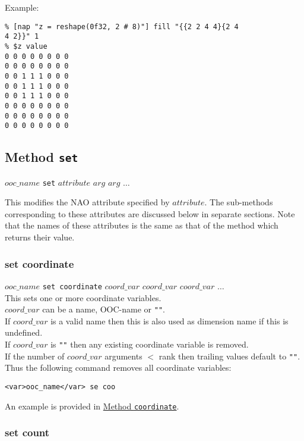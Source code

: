 Example:
  \begin{verbatim}
% [nap "z = reshape(0f32, 2 # 8)"] fill "{{2 2 4 4}{2 4
4 2}}" 1
% $z value
0 0 0 0 0 0 0 0
0 0 0 0 0 0 0 0
0 0 1 1 1 0 0 0
0 0 1 1 1 0 0 0
0 0 1 1 1 0 0 0
0 0 0 0 0 0 0 0
0 0 0 0 0 0 0 0
0 0 0 0 0 0 0 0
\end{verbatim}

  \subsection{
    \label{set}Method \texttt{set}
  }

  


  $ooc\_name$ 
  \texttt{set} 
  $attribute$ $arg$ $arg$ $\ldots$
  

This modifies the NAO attribute specified by 
  $attribute$. The sub-methods corresponding to these
  attributes are discussed below in separate sections. Note that the
  names of these attributes is the same as that of the method which
  returns their value.
  \subsubsection{
    \label{set-coordinate}set coordinate
  }

  


  $ooc\_name$ 
  \texttt{set coordinate} 
  $coord\_var$ 
  $coord\_var$ 
  $coord\_var$ $\ldots$
  \\
  

This sets one or more coordinate variables.
  \\
  $coord\_var$ can be a name, OOC-name or 
  \texttt{""}.
  \\If 
  $coord\_var$ is a valid name then this is also used as
  dimension name if this is undefined.
  \\If 
  $coord\_var$ is 
  \texttt{""} then any existing coordinate variable is
  removed.
  \\If the number of 
  $coord\_var$ arguments $<$ rank then trailing values default
  to 
  \texttt{""}. Thus the following command removes all
  coordinate variables:
  \begin{verbatim}
<var>ooc_name</var> se coo
\end{verbatim}

  

An example is provided in 
  \href{ooc-meta.html\#coordinate}{Method \texttt{coordinate}}.
  \subsubsection{
    \label{set-count}set count
  }

